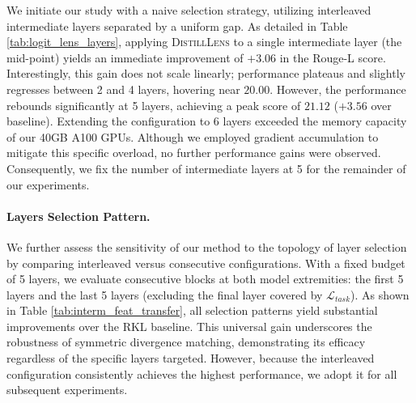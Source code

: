 \documentclass{article}
\theoremstyle{plain}
\theoremstyle{definition}
\theoremstyle{remark}
\begin{document}
We initiate our study with a naive selection strategy, utilizing interleaved intermediate layers separated by a uniform gap.
As detailed in Table \ref{tab:logit_lens_layers}, applying \textsc{DistillLens} to a single intermediate layer (the mid-point) yields an immediate improvement of $+3.06$ in the Rouge-L score. 
Interestingly, this gain does not scale linearly; performance plateaus and slightly regresses between 2 and 4 layers, hovering near $20.00$. 
However, the performance rebounds significantly at 5 layers, achieving a peak score of $\mathbf{21.12}$ ($\mathbf{+3.56}$ over baseline). 
Extending the configuration to 6 layers exceeded the memory capacity of our 40GB A100 GPUs. 
Although we employed gradient accumulation to mitigate this specific overload, no further performance gains were observed. 
Consequently, we fix the number of intermediate layers at 5 for the remainder of our experiments.

\paragraph{Layers Selection Pattern.}

\begin{table}[t]
    \centering
    \caption{\textbf{R-L Score.} \textsc{DistillLens} performs better with an interleaved layers selection pattern than consecutive.}
    \label{tab:layer_selection_pattern}
\end{table}

We further assess the sensitivity of our method to the topology of layer selection by comparing interleaved versus consecutive configurations. 
With a fixed budget of 5 layers, we evaluate consecutive blocks at both model extremities: the first 5 layers and the last 5 layers (excluding the final layer covered by $\mathcal{L}_{task}$). 
As shown in Table \ref{tab:interm_feat_transfer}, all selection patterns yield substantial improvements over the RKL baseline. 
This universal gain underscores the robustness of symmetric divergence matching, demonstrating its efficacy regardless of the specific layers targeted. 
However, because the interleaved configuration consistently achieves the highest performance, we adopt it for all subsequent experiments.
\end{document}
